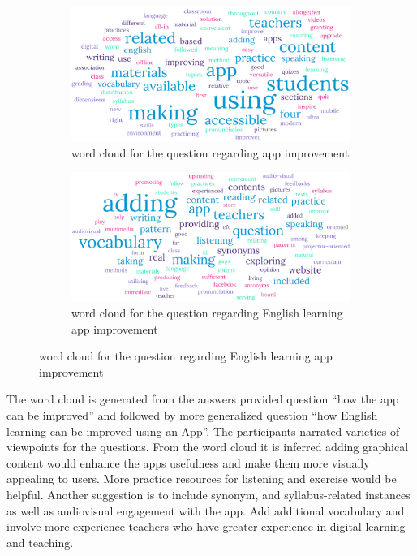 \documentclass[sn-mathphys,Numbered]{sn-jnl}%
\theoremstyle{thmstyleone}%
\theoremstyle{thmstyletwo}%
\theoremstyle{thmstylethree}%
\begin{document}
\begin{figure}[h!]
\centering
\begin{subfigure}{0.48\textwidth}
    \includegraphics[width=\textwidth]{app_impv.png}
    \caption{word cloud for the question regarding app improvement}
    \label{cv}
\end{subfigure}
\hfill
\begin{subfigure}{0.48\textwidth}
    \includegraphics[width=\textwidth]{eng_app_impv.png}
    \caption{word cloud for the question regarding English learning app improvement}
    \label{umass}
\end{subfigure}       
\label{cv_umass}
\end{figure}

The word cloud is generated from the answers provided question ``how the
app can be improved'' and followed by more generalized question ``how
English learning can be improved using an App''. The participants
narrated varieties of viewpoints for the questions. From the word cloud
it is inferred adding graphical content would enhance the
apps\textquotesingle{} usefulness and make them more visually appealing
to users. More practice resources for listening and exercise would be
helpful. Another suggestion is to include synonym, and syllabus-related
instances as well as audiovisual engagement with the app. Add additional
vocabulary and involve more experience teachers who have greater
experience in digital learning and teaching.
\end{document}
